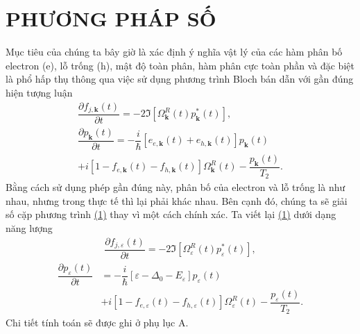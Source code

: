 \documentclass[%
 reprint,
 amsmath,amssymb,
 aps,
]{revtex4-2}
\newcommand{\f}[2]{\dfrac{#1}{#2}}
\begin{document}
\section{\label{sec:level2} PHƯƠNG PHÁP SỐ}
Mục tiêu của chúng ta bây giờ là xác định ý nghĩa vật lý của các hàm phân bố electron (e), lỗ trống (h), mật độ toàn phân, hàm phân cực toàn phần và đặc biệt là phổ hấp thụ thông qua việc sử dụng phương trình Bloch bán dẫn với gần đúng hiện tượng luận
\begin{equation}
	\begin{aligned}
		\f{\partial f_{j,\mathbf{k}} (t)}{\partial t} = - 2 \Im \left[ \Omega_{\mathbf{k}}^{R}(t) p^{*}_{\mathbf{k}}(t)\right], \label{Eq:1}\\
		\f{\partial p_{\mathbf{k}}(t)}{\partial t} = - \f{i}{\hbar} \left[ e_{e,\mathbf{k}}(t) + e_{h,\mathbf{k}}(t)  \right] p_{\mathbf{k}}(t) \\
		+ i \left[ 1 - f_{e,\mathbf{k}}(t) - f_{h,\mathbf{k}}(t) \right] \Omega_{\mathbf{k}}^{R}(t) - \f{p_{\mathbf{k}}(t)}{T_{2}}. 
	\end{aligned}
\end{equation}
Bằng cách sử dụng phép gần đúng này, phân bố của electron và lỗ trống là như nhau, nhưng trong thực tế thì lại phải khác nhau. Bên cạnh đó, chúng ta sẽ giải số cặp phương trình \hyperref[Eq:1]{(1)} thay vì một cách chính xác. Ta viết lại \hyperref[Eq:1]{(1)} dưới dạng năng lượng
\begin{equation}
	\begin{aligned}
		\f{\partial f_{j,\varepsilon} (t)}{\partial t} = - 2 \Im \left[ \Omega_{\varepsilon}^{R}(t) p^{*}_{\varepsilon}(t)\right], \label{Eq:2}
	\end{aligned}
\end{equation}
\begin{equation}
	\begin{aligned}
		\f{\partial p_{\varepsilon}(t)}{\partial t} 
		&= - \f{i}{\hbar} \left[ \varepsilon - \Delta_{0} - E_{\varepsilon}  \right] p_{\varepsilon}(t) \\
		&+ i \left[ 1 - f_{e,\varepsilon}(t) - f_{h,\varepsilon}(t) \right] \Omega_{\varepsilon}^{R}(t) - \f{p_{\varepsilon}(t)}{T_{2}}. \label{Eq:3}
	\end{aligned}
\end{equation}
Chi tiết tính toán sẽ được ghi ở phụ lục A.
\end{document}
